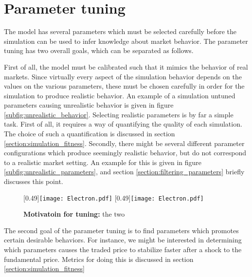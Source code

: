 
\chapter{Parameter tuning} %

	

The model has several parameters which must be selected carefully before the simulation can be used to infer knowledge about market behavior. The parameter tuning has two overall goals, which can be separated as follows. 

First of all, the model must be calibrated such that it mimics the behavior of real markets. Since virtually every aspect of the simulation behavior depends on the values on the various parameters, these must be chosen carefully in order for the simulation to produce realistic behavior. An example of a simulation untuned parameters causing  unrealistic behavior is given in figure \ref{subfig:unrealistic_behavior}. Selecting realistic parameters is by far a simple task. First of all, it requires a way of quantifying the quality of each simulation. The choice of such a quantification is discussed in section \ref{section:simulation_fitness}. Secondly, there might be several different parameter configurations which produce seemingly realistic behavior, but do not correspond to a realistic market setting. An example for this is given in figure \ref{subfig:unrealistic_parameters}, and section \ref{section:filtering_parameters} briefly discusses this point. 
\begin{figure}
[0.49\linewidth]{\texttt{[image: Electron.pdf]}}
[0.49\linewidth]{\texttt{[image: Electron.pdf]}}
\caption{\textbf{Motivatoin for tuning:} the two}\label{fig:tuning_motivation}
\end{figure}

The second goal of the parameter tuning is to find parameters which promotes certain desirable behaviors. For instance, we might be interested in determining which parameters causes the traded price to stabilize faster after a shock to the fundamental price. Metrics for doing this is discussed in section \ref{section:simulation_fitness}

